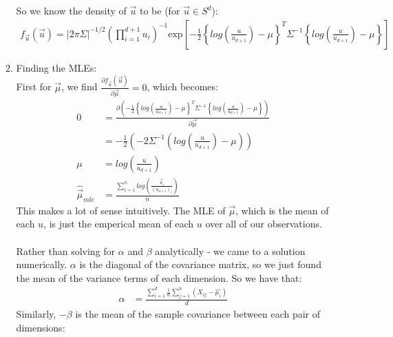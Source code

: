 \documentclass[paper=a4, fontsize=11pt]{scrartcl}
\newcommand{\parens}[1]{ \left( #1 \right) }
\begin{document}
\begin{enumerate}[1.]
\begin{enumerate}[1.]
        So we know the density of $\vec{u}$ to be (for $\vec{u} \in S^d$):
        \begin{align*}
          f_{\vec{u}}(\vec{u}) = |2\pi \Sigma|^{-1/2}
                        \parens{ \prod_{i = 1}^{d+1}{u_{i}} }^{-1}
                        \mbox{exp}
                          \left[
                            -\frac{1}{2}
                            \left\{
                              log\parens{ \frac{u}{u_{d+1}}}-\mu \right\}^T\Sigma^{-1}\left\{log\parens{ \frac{u}{u_{d+1}} }-\mu
                            \right\}
                          \right]
        \end{align*}
      \item Finding the MLEs: \\
        First for $\vec{\mu}$, we find $\frac{\partial{f_{\vec{u}}(\vec{u})}}{\partial{\vec{\mu}}} = 0$, which becomes: \\
        \begin{align*}
          0 &= \frac{\partial{(-\frac{1}{2}
                            \left\{
                              log\parens{ \frac{u}{u_{d+1}}}-\mu \right\}^T\Sigma^{-1}\left\{log\parens{ \frac{u}{u_{d+1}} }-\mu
                            \right\}
                )}}{\partial{\vec{\mu}}} \\
            &= -\frac{1}{2}\parens{
              -2\Sigma^{-1}\parens{
                log\parens{ \frac{u}{ u_{d+1} } } - \mu
              }
            } \\
          \mu &= log\parens{ \frac{u}{ u_{d+1} } } \\
          \hat{\vec{\mu}}_{mle} &= \frac{\sum_{i=1}^n{log \parens{ \frac{\vec{u}_i}{(u_{d+1})_i}}}}{n}
        \end{align*}
        This makes a lot of sense intuitively. The MLE of $\vec{\mu}$, which is the mean of each $u$, is just the emperical mean of each $u$ over all of our observations. \\ \\
        Rather than solving for $\alpha$ and $\beta$ analytically - we came to a solution numerically. $\alpha$ is the diagonal of the covariance matrix, so we just found the mean of the variance terms of each dimension. So we have that: \\
        \begin{align*}
          \alpha &= \frac{\sum_{i=1}^{d}{\frac{1}{n}\sum_{j=1}^{n}{(X_{ij} - \hat{\mu_i})}}}{d}
        \end{align*}
        Similarly, $-\beta$ is the mean of the sample covariance between each pair of dimensions:

\end{enumerate}
\end{enumerate}
\end{document}
